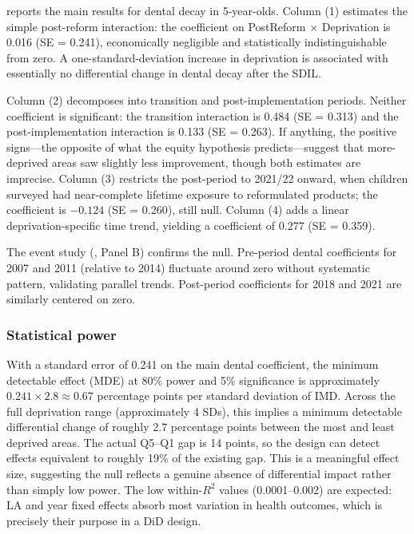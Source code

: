 \documentclass[12pt]{article}
\begin{document}
 reports the main results for dental decay in 5-year-olds. Column (1) estimates the simple post-reform interaction: the coefficient on PostReform $\times$ Deprivation is 0.016 (SE = 0.241), economically negligible and statistically indistinguishable from zero. A one-standard-deviation increase in deprivation is associated with essentially no differential change in dental decay after the SDIL.

Column (2) decomposes into transition and post-implementation periods. Neither coefficient is significant: the transition interaction is 0.484 (SE = 0.313) and the post-implementation interaction is 0.133 (SE = 0.263). If anything, the positive signs---the opposite of what the equity hypothesis predicts---suggest that more-deprived areas saw slightly less improvement, though both estimates are imprecise. Column (3) restricts the post-period to 2021/22 onward, when children surveyed had near-complete lifetime exposure to reformulated products; the coefficient is $-0.124$ (SE = 0.260), still null. Column (4) adds a linear deprivation-specific time trend, yielding a coefficient of 0.277 (SE = 0.359).

The event study (, Panel B) confirms the null. Pre-period dental coefficients for 2007 and 2011 (relative to 2014) fluctuate around zero without systematic pattern, validating parallel trends. Post-period coefficients for 2018 and 2021 are similarly centered on zero.

\subsubsection*{Statistical power} With a standard error of 0.241 on the main dental coefficient, the minimum detectable effect (MDE) at 80\% power and 5\% significance is approximately $0.241 \times 2.8 \approx 0.67$ percentage points per standard deviation of IMD. Across the full deprivation range (approximately 4 SDs), this implies a minimum detectable differential change of roughly 2.7 percentage points between the most and least deprived areas. The actual Q5--Q1 gap is 14 points, so the design can detect effects equivalent to roughly 19\% of the existing gap. This is a meaningful effect size, suggesting the null reflects a genuine absence of differential impact rather than simply low power. The low within-$R^2$ values (0.0001--0.002) are expected: LA and year fixed effects absorb most variation in health outcomes, which is precisely their purpose in a DiD design.
\end{document}

